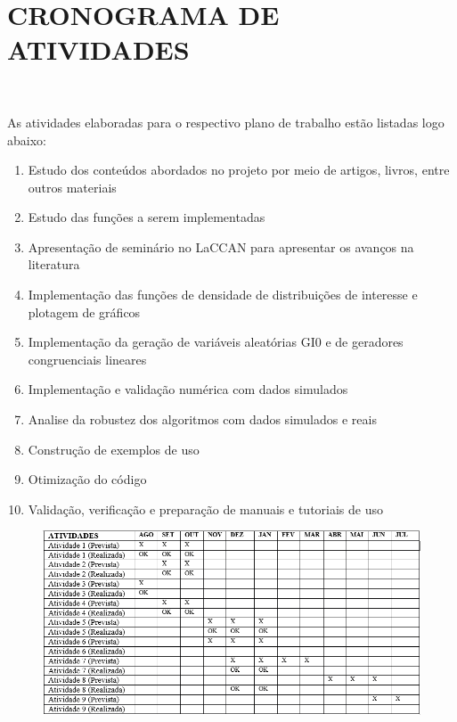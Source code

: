 \documentclass[12pt,letterpaper]{article}
\begin{document}

\newpage
\section*{\centering \textbf{CRONOGRAMA DE ATIVIDADES}}
\hrulefill \\

\vspace{0.5cm}

As atividades elaboradas para o respectivo plano de trabalho estão listadas logo abaixo:

\begin{small}
\begin{enumerate} 
  \item  Estudo dos conteúdos abordados no projeto por meio de artigos, livros, entre outros materiais
  \item  Estudo das funções a serem implementadas
  \item  Apresentação de seminário no LaCCAN para apresentar os avanços na literatura
  \item  Implementação das funções de densidade de distribuições de interesse e plotagem de gráficos
  \item Implementação da geração de variáveis aleatórias GI0 e de geradores congruenciais lineares
  \item  Implementação e validação numérica com dados simulados
  \item Analise da robustez dos algoritmos com dados simulados e reais 
  \item  Construção de exemplos de uso 
   \item  Otimização do código
   \item Validação, verificação e preparação de manuais e tutoriais de uso 

\end{enumerate}
\end{small}

\begin{figure}[!hbt]
	\begin{center}
    \vspace{-0.5cm}
		\includegraphics[width=0.9\columnwidth]{tabela-cronograma.png}
	\end{center}
\end{figure}
\end{document}
